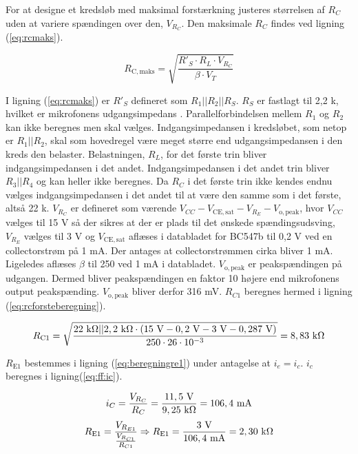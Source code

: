 For at designe et kredsløb med maksimal forstærkning justeres størrelsen af $R_C$ uden at variere spændingen over den, $V_{R_C}$. Den maksimale $R_C$ findes ved ligning (\ref{eq:rcmaks}).

\begin{equation}
R_{\mathrm{C,maks}} = \sqrt{\frac{R'_S \cdot R_L \cdot V_{R_C}}{\beta \cdot V_T}}
\label{eq:rcmaks}
\end{equation}

I ligning (\ref{eq:rcmaks}) er $R'_S$ defineret som $R_1||R_2||R_S$. $R_S$ er fastlagt til 2,2 k\ohm, hvilket er mikrofonens udgangsimpedans \cite{mic-datablad}. Parallelforbindelsen mellem $R_1$ og $R_2$ kan ikke beregnes men skal vælges. Indgangsimpedansen i kredsløbet, som netop er $R_1||R_2$, skal som hovedregel være meget større end udgangsimpedansen i den kreds den belaster. Belastningen, $R_L$, for det første trin bliver indgangsimpedansen i det andet. Indgangsimpedansen i det andet trin bliver $R_3||R_4$ og kan heller ikke beregnes. Da $R_C$ i det første trin ikke kendes endnu vælges indgangsimpedansen i det andet til at være den samme som i det første, altså 22 k\ohm. 
$V_{R_C}$ er defineret som værende $V_{CC} - V_{\mathrm{CE,sat}} - V_{R_E} - V_{\mathrm{o,peak}}$, hvor $V_{CC}$ vælges til 15 V så der sikres at der er plads til det ønskede spændingsudsving, $V_{R_E}$ vælges til 3 V og $V_{\mathrm{CE,sat}}$ aflæses i databladet for BC547b \cite{bc547b-datablad} til 0,2 V ved en collectorstrøm på 1 mA. Der antages at collectorstrømmen cirka bliver 1 mA. Ligeledes aflæses $\beta$ til 250 ved 1 mA i databladet. $V_{\mathrm{o,peak}}$ er peakspændingen på udgangen. Dermed bliver peakspændingen en faktor 10 højere end mikrofonens output peakspænding. $V_{\mathrm{o,peak}}$ bliver derfor 316 mV. $R_{C1}$ beregnes hermed i ligning (\ref{eq:rcforsteberegning}).

\begin{equation}
R_{\mathrm{C1}} = \sqrt{\frac{22~\mathrm{k}\ohm || 2,2~\mathrm{k}\ohm \cdot (15~\mathrm{V} - 0,2~\mathrm{V} - 3~\mathrm{V} - 0,287~\mathrm{V})}{250 \cdot 26 \cdot 10^{-3}}}=8,83~\mathrm{k}\ohm
\label{eq:rcforsteberegning}
\end{equation}

$R_{\mathrm{E1}}$ bestemmes i ligning (\ref{eq:beregningre1}) under antagelse at $i_e = i_c$.  $i_c$ beregnes i ligning(\ref{eq:ff:ic}).

\begin{equation}
\label{eq:ff:ic}
i_C=\frac{V_{R_C}}{R_C}=\frac{11,5~\mathrm{V}}{9,25~\mathrm{k}\ohm}=106,4~\mathrm{mA}
\end{equation}
\begin{equation}
R_{\mathrm{E1}}=\frac{V_{R_{E1}}}{\frac{V_{R_{C1}}}{R_{C1}}}  \Rightarrow R_{\mathrm{E1}}=\frac{3~\mathrm{V}}{106,4~\mathrm{mA}}=2,30~\mathrm{k}\ohm
\label{eq:beregningre1}
\end{equation}


